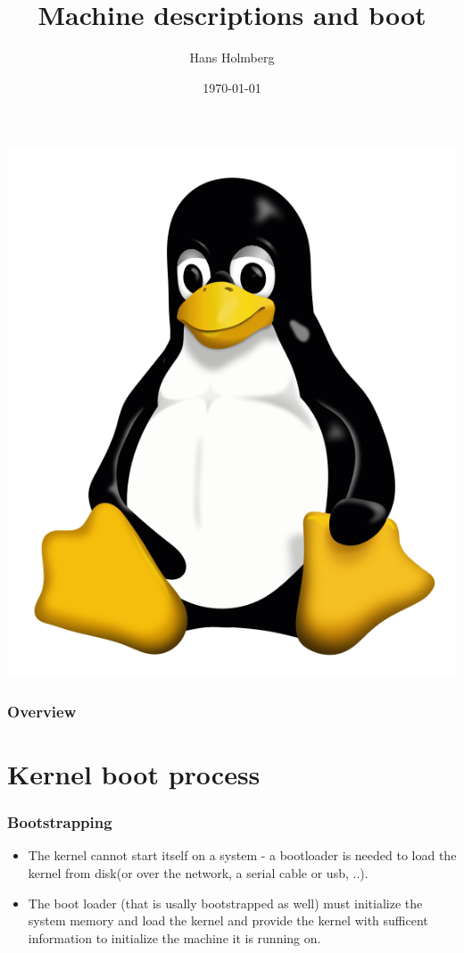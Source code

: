 \documentclass{beamer}
\title[TLKDCC Machine descriptions and boot]{Machine descriptions and boot}
\author{Hans Holmberg}
\institute[LKTP]
{
Linux Kernel Teaching Project \\ 
\medskip
\textit{hans.holmberg@gmail.com}
}
\date{\today}
\begin{document}
\begin{frame}
\titlepage
\includegraphics{../common/tux} 
\end{frame}

\begin{frame}
\frametitle{Overview}
\tableofcontents 
\end{frame}

\section{Kernel boot process}

\begin{frame}
\frametitle{Bootstrapping}
\begin{itemize}
	\item The kernel cannot start itself on a system - a bootloader is needed to load the kernel from disk(or over the network,  a serial cable or usb, ..).
	\item The boot loader (that is usally bootstrapped as well) must initialize the system memory and load the kernel and provide the kernel with sufficent information to initialize the machine it is running on.
\end{itemize}
\end{frame}
\end{document}

